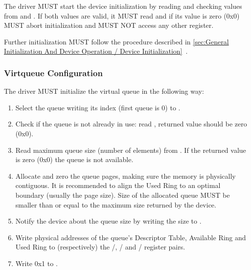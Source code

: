 The driver MUST start the device initialization by reading and
checking values from  and .
If both values are valid, it MUST read 
and if its value is zero (0x0) MUST abort initialization and
MUST NOT access any other register.

Further initialization MUST follow the procedure described in
\ref{sec:General Initialization And Device Operation / Device Initialization}~.

\subsubsection{Virtqueue Configuration}\label{sec:Virtio Transport Options / Virtio Over MMIO / MMIO-specific Initialization And Device Operation / Virtqueue Configuration}

The driver MUST initialize the virtual queue in the following way:

\begin{enumerate}
\item Select the queue writing its index (first queue is 0) to
   .

\item Check if the queue is not already in use: read ,
   returned value should be zero (0x0).

\item Read maximum queue size (number of elements) from
   . If the returned value is zero (0x0) the
   queue is not available.

\item Allocate and zero the queue pages, making sure the memory
   is physically contiguous. It is recommended to align the
   Used Ring to an optimal boundary (usually the page size).
   Size of the allocated queue MUST be smaller than or equal to
   the maximum size returned by the device.

\item Notify the device about the queue size by writing the size to
   .

\item Write physical addresses of the queue's Descriptor Table,
   Available Ring and Used Ring to (respectively) the
   /,
   / and
   / register pairs.

\item Write 0x1 to .
\end{enumerate}

